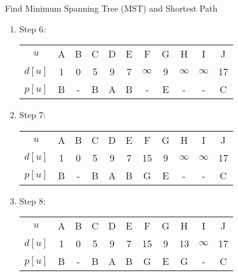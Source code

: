 \documentclass{article}
\numberwithin{table}{section}
\numberwithin{figure}{section}
\begin{document}
\begin{section}{Find Minimum Spanning Tree (MST) and Shortest Path}
\begin{enumerate}[(A)]
\begin{tcolorbox}[breakable]
\begin{enumerate}[(1)]
                \item Step 6:
                \begin{table}[H]
                    \centering
                    \begin{tabular}{c|cccccccccc}
                        \hline
                        $u$ & A & B & C & D & E & F & G & H & I & J \\
                        $d[u]$ & 1 & 0 & 5 & 9 & 7 & $\infty$ & 9 & $\infty$ & $\infty$ & 17 \\
                        $p[u]$ & B & - & B & A & B & - & E & - & - & C \\
                        \hline
                    \end{tabular}
                \end{table}
                

                \item Step 7:
                \begin{table}[H]
                    \centering
                    \begin{tabular}{c|cccccccccc}
                        \hline
                        $u$ & A & B & C & D & E & F & G & H & I & J \\
                        $d[u]$ & 1 & 0 & 5 & 9 & 7 & 15 & 9 & $\infty$ & $\infty$ & 17 \\
                        $p[u]$ & B & - & B & A & B & G & E & - & - & C \\
                        \hline
                    \end{tabular}
                \end{table}
                

                \item Step 8:
                \begin{table}[H]
                    \centering
                    \begin{tabular}{c|cccccccccc}
                        \hline
                        $u$ & A & B & C & D & E & F & G & H & I & J \\
                        $d[u]$ & 1 & 0 & 5 & 9 & 7 & 15 & 9 & 13 & $\infty$ & 17 \\
                        $p[u]$ & B & - & B & A & B & G & E & G & - & C \\
                        \hline
                    \end{tabular}
                \end{table}
                


\end{enumerate}
\end{tcolorbox}
\end{enumerate}
\end{section}
\end{document}
